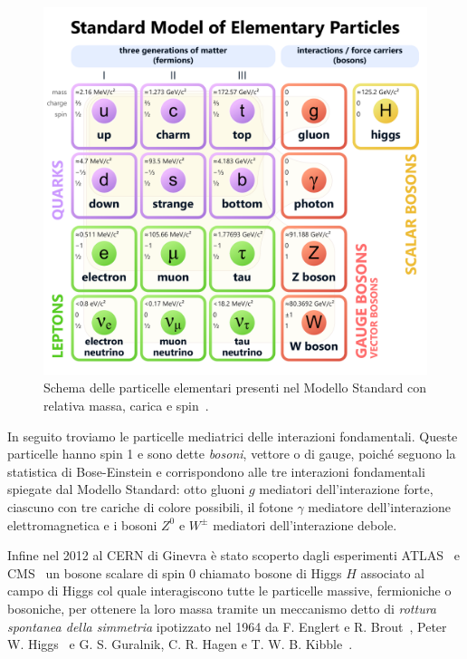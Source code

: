     \begin{figure}[t]
        \centering
        \includegraphics[width=0.8\linewidth]{res/fig/1-chapter/1-Standard_Model_of_Elementary_Particles.pdf}
        \caption{Schema delle particelle elementari presenti nel Modello Standard con relativa massa, carica e spin~\cite{Wikimedia_Standard_Model}.}
        \label{fig:1-standard-model}
    \end{figure}

    In seguito troviamo le particelle mediatrici delle interazioni fondamentali. Queste particelle hanno spin 1 e sono dette \textit{bosoni}, vettore o di gauge, poiché seguono la statistica di Bose-Einstein e corrispondono alle tre interazioni fondamentali spiegate dal Modello Standard: otto gluoni $g$ mediatori dell'interazione forte, ciascuno con tre cariche di colore possibili, il fotone $\gamma$ mediatore dell'interazione elettromagnetica e i bosoni $Z^0$ e $W^\pm$ mediatori dell'interazione debole.

    Infine nel 2012 al CERN di Ginevra è stato scoperto dagli esperimenti ATLAS~\cite{ATLAS_2012} e CMS~\cite{CMS_2012} un bosone scalare di spin \num{0} chiamato bosone di Higgs $H$ associato al campo di Higgs col quale interagiscono tutte le particelle massive, fermioniche o bosoniche, per ottenere la loro massa tramite un meccanismo detto di \textit{rottura spontanea della simmetria} ipotizzato nel 1964 da F. Englert e R. Brout~\cite{Englert_1964}, Peter W. Higgs~\cite{Higgs_1964} e G. S. Guralnik, C. R. Hagen e T. W. B. Kibble~\cite{GHK_1964}.
    
